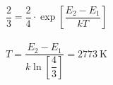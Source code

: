 \documentclass{article}
\begin{document}
\begin{equation*}
  \begin{aligned}
    \dfrac{2}{3} = \dfrac{2}{4} \cdot \exp \left[ \dfrac{E_2 - E_1}{kT}  \right]  
  \end{aligned}
\end{equation*}

\begin{equation*}
  \begin{aligned}
    T = \dfrac{E_2 - E_1}{k \ln \left[ \dfrac{4}{3}  \right]} = 2773 \  \mathrm{K}
  \end{aligned}
\end{equation*}
\end{document}
